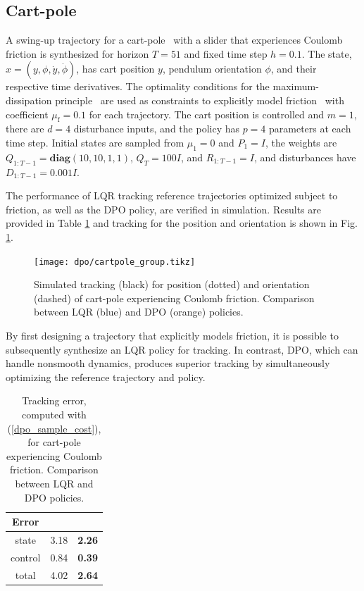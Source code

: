 \subsection{Cart-pole}
A swing-up trajectory for a cart-pole~\cite{tedrake2014underactuated} with a slider that experiences Coulomb friction is synthesized for horizon $T = 51$ and fixed time step $h = 0.1$. The state, $x = (y, \phi, \dot{y}, \dot{\phi})$, has cart position $y$, pendulum orientation $\phi$, and their respective time derivatives. The optimality conditions for the maximum-dissipation principle~\cite{moreau2011unilateral} are used as constraints to explicitly model friction~\cite{manchester2020variational} with coefficient $\mu_{\text{f}} = 0.1$ for each trajectory. The cart position is controlled and $m = 1$,  there are $d = 4$ disturbance inputs, and the policy has $p = 4$ parameters at each time step. Initial states are sampled from $\mu_1 = 0$ and $P_1 = I$, the weights are $Q_{1:T-1} = \textbf{diag}(10,10,1,1)$, $Q_T = 100I$, and $R_{1:T-1}= I$, and disturbances have $D_{1:T-1} = 0.001 I$.

The performance of LQR tracking reference trajectories optimized subject to friction, as well as the DPO policy, are verified in simulation. Results are provided in Table \ref{dpo_cartpole_results} and tracking for the position and orientation is shown in Fig. \ref{dpo_cartpole_sim}. 

\begin{figure}[H]
	\centering
	\texttt{[image: dpo/cartpole\_group.tikz]}
	\caption[Tracking performance for cart-pole with friction]{Simulated tracking (black) for position (dotted) and orientation (dashed) of cart-pole experiencing Coulomb friction. Comparison between LQR (blue) and DPO (orange) policies.}
	\label{dpo_cartpole_sim}
\end{figure}

By first designing a trajectory that explicitly models friction, it is possible to subsequently synthesize an LQR policy for tracking. In contrast, DPO, which can handle nonsmooth dynamics, produces superior tracking by simultaneously optimizing the reference trajectory and policy.

\begin{table}[H]
	\centering
	\caption[Policy tracking error for cart-pole with friction]{Tracking error, computed with (\ref{dpo_sample_cost}), for cart-pole experiencing Coulomb friction. Comparison between LQR and DPO policies.}
	\begin{tabular}{c c c}
		\toprule
		\textbf{Error} &
		\specialcellbold{LQR} &
		\specialcellbold{DPO} \\
		\toprule
		state & 3.18 & \textbf{2.26}\\
		control & 0.84 & \textbf{0.39}\\
		total & 4.02 & \textbf{2.64}\\
		\toprule
	\end{tabular}
	\label{dpo_cartpole_results}
\end{table}

